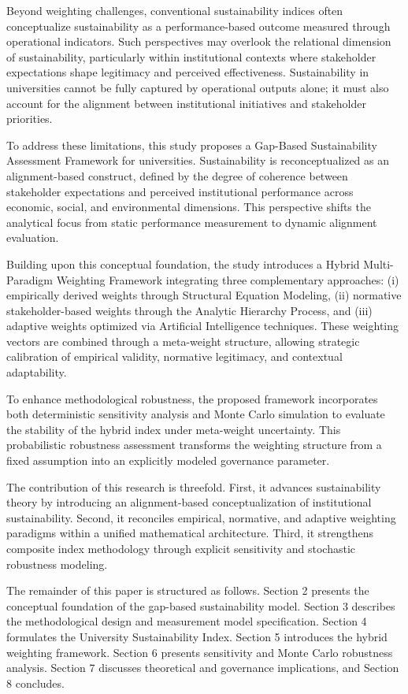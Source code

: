 \documentclass[11pt,a4paper]{article}
\begin{document}
Beyond weighting challenges, conventional sustainability indices often conceptualize 
sustainability as a performance-based outcome measured through operational indicators. 
Such perspectives may overlook the relational dimension of sustainability, particularly 
within institutional contexts where stakeholder expectations shape legitimacy and perceived 
effectiveness. Sustainability in universities cannot be fully captured by operational outputs 
alone; it must also account for the alignment between institutional initiatives and stakeholder 
priorities.

To address these limitations, this study proposes a Gap-Based Sustainability Assessment 
Framework for universities. Sustainability is reconceptualized as an alignment-based construct, 
defined by the degree of coherence between stakeholder expectations and perceived institutional 
performance across economic, social, and environmental dimensions. This perspective shifts the 
analytical focus from static performance measurement to dynamic alignment evaluation.

Building upon this conceptual foundation, the study introduces a Hybrid Multi-Paradigm 
Weighting Framework integrating three complementary approaches: (i) empirically derived 
weights through Structural Equation Modeling, (ii) normative stakeholder-based weights 
through the Analytic Hierarchy Process, and (iii) adaptive weights optimized via Artificial 
Intelligence techniques. These weighting vectors are combined through a meta-weight structure, 
allowing strategic calibration of empirical validity, normative legitimacy, and contextual 
adaptability.

To enhance methodological robustness, the proposed framework incorporates both deterministic 
sensitivity analysis and Monte Carlo simulation to evaluate the stability of the hybrid index 
under meta-weight uncertainty. This probabilistic robustness assessment transforms the 
weighting structure from a fixed assumption into an explicitly modeled governance parameter.

The contribution of this research is threefold. First, it advances sustainability theory by 
introducing an alignment-based conceptualization of institutional sustainability. Second, it 
reconciles empirical, normative, and adaptive weighting paradigms within a unified mathematical 
architecture. Third, it strengthens composite index methodology through explicit sensitivity 
and stochastic robustness modeling.

The remainder of this paper is structured as follows. Section 2 presents the conceptual 
foundation of the gap-based sustainability model. Section 3 describes the methodological 
design and measurement model specification. Section 4 formulates the University Sustainability 
Index. Section 5 introduces the hybrid weighting framework. Section 6 presents sensitivity 
and Monte Carlo robustness analysis. Section 7 discusses theoretical and governance 
implications, and Section 8 concludes.





\end{document}
